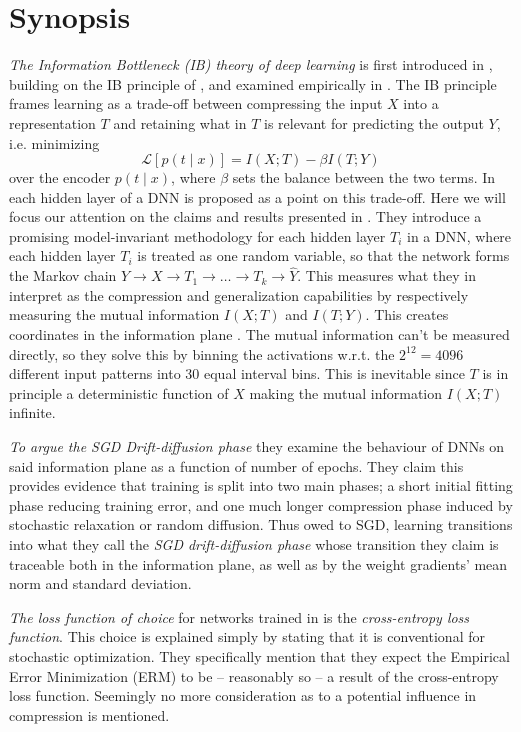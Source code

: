 \section{Synopsis}\label{sec:synopsis}

\textit{The Information Bottleneck (IB) theory of deep learning} is first
introduced in \cite{tishby2015}, building on the IB principle of
\cite{tishby1999}, and examined empirically in \cite{shwartzziv2017}. The IB
principle frames learning as a trade-off between compressing the input $X$
into a representation $T$ and retaining what in $T$ is relevant for predicting
the output $Y$, i.e. minimizing
\begin{equation}
	\mathcal{L}[p(t\mid x)] = I(X;T)-\beta I(T;Y)
\end{equation}
over the encoder $p(t\mid x)$, where $\beta$ sets the balance between the two
terms. In \cite{tishby2015} each hidden layer of a DNN is proposed as a point
on this trade-off. Here we will focus our attention on the claims and results
presented in \cite{shwartzziv2017}. They introduce a promising model-invariant
methodology for each hidden layer $T_i$ in a DNN, where each hidden layer
$T_i$ is treated as one random variable, so that the network forms the Markov
chain $Y\to X\to T_1\to\dots\to T_k\to\hat{Y}$. This measures what they in
\cite{shwartzziv2017} interpret as the compression and generalization
capabilities by respectively measuring the mutual information $I(X;T)$ and
$I(T;Y)$. This creates coordinates in the information plane \cite{tishby2015}.
The mutual information can't be measured directly, so they solve this by
binning the activations w.r.t. the $2^{12}=4096$ different input patterns into
30 equal interval bins. This is inevitable since $T$ is in principle a
deterministic function of $X$ making the mutual information $I(X; T)$
infinite.

\textit{To argue the SGD Drift-diffusion phase} they examine the behaviour of
DNNs on said information plane as a function of number of epochs. They claim
this provides evidence that training is split into two main phases; a short
initial fitting phase reducing training error, and one much longer compression
phase induced by stochastic relaxation or random diffusion. Thus owed to SGD,
learning transitions into what they call the \textit{SGD drift-diffusion phase}
whose transition they claim is traceable both in the information plane, as well
as by the weight gradients' mean norm and standard deviation.

\textit{The loss function of choice} for networks trained in
\cite{shwartzziv2017} is the \textit{cross-entropy loss function}. This choice
is explained simply by stating that it is conventional for stochastic
optimization. They specifically mention that they expect the
Empirical Error Minimization (ERM) to be -- reasonably so -- a result of the
cross-entropy loss function. Seemingly no more consideration as to a potential
influence in compression is mentioned.
